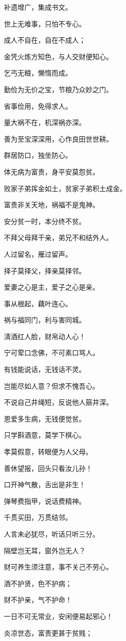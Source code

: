 \documentclass[12pt,oneside]{book}
\begin{document}
补遗增广，集成书文。

世上无难事，只怕不专心。

成人不自在，自在不成人；

金凭火炼方知色，与人交财便知心。

乞丐无粮，懒惰而成。

勤俭为无价之宝，节粮乃众妙之门。

省事俭用，免得求人。

量大祸不在，机深祸亦深。

善为至宝深深用，心作良田世世耕。

群居防口，独坐防心。

体无病为富贵，身平安莫怨贫。

败家子弟挥金如土，贫家子弟积土成金。

富贵非关天地，祸福不是鬼神。

安分贫一时，本分终不贫。

不拜父母拜干亲，弟兄不和结外人。

人过留名，雁过留声。

择子莫择父，择亲莫择邻。

爱妻之心是主，爱子之心是亲。

事从根起，藕叶连心。

祸与福同门，利与害同城。

淸酒红人脸，财帛动人心！

宁可荤口念佛，不可素口骂人。

有钱能说话，无钱话不灵。

岂能尽如人意？但求不愧吾心。

不说自己井绳短，反说他人箍井深。

恩爱多生病，无钱便觉贫。

只学斟酒意，莫学下棋心。

孝莫假意，转眼便为人父母。

善休望报，回头只看汝儿孙！

口开神气散，舌出是非生！

弹琴费指甲，说话费精神。

千贯买田，万贯结邻。

人言未必犹尽，听话只听三分。

隔壁岂无耳，窗外岂无人？

财可养生须注意，事不关己不劳心。

酒不护贤，色不护病；

财不护亲，气不护命！

一日不可无常业，安闲便易起邪心！

炎凉世态，富贵更甚于贫贱；
\end{document}
